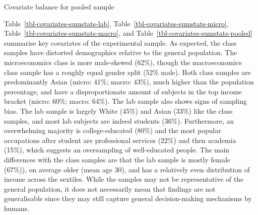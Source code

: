 \documentclass[
  12,
  letterpaper,
  DIV=11,
  numbers=noendperiod]{scrartcl}
\begin{document}
\begin{table}
{}

\caption{\label{tbl-covariates-sumstats-pooled}Covariate balance for
pooled sample}

\end{table}%

Table~\ref{tbl-covariates-sumstats-lab},
Table~\ref{tbl-covariates-sumstats-micro},
Table~\ref{tbl-covariates-sumstats-macro}, and
Table~\ref{tbl-covariates-sumstats-pooled} summarise key covariates of
the experimental sample. As expected, the class samples have distorted
demographics relative to the general population. The microeconomics
class is more male-skewed (62\%), though the macroeconomics class sample
has a roughly equal gender split (52\% male). Both class samples are
predominantly Asian (micro: 41\%; macro: 43\%), much higher than the
population percentage, and have a disproportionate amount of subjects in
the top income bracket (micro: 60\%; macro: 64\%). The lab sample also
shows signs of sampling bias. The lab sample is largely White (45\%) and
Asian (33\%) like the class samples, and most lab subjects are indeed
students (36\%). Furthermore, an overwhelming majority is
college-educated (80\%) and the most popular occupations after student
are professional services (22\%) and then academia (15\%), which
suggests an oversampling of well-educated people. The main differences
with the class samples are that the lab sample is mostly female (67\%)),
on average older (mean age 30), and has a relatively even distribution
of income across the sextiles. While the samples may not be
representative of the general population, it does not necessarily mean
that findings are not generalisable since they may still capture general
decision-making mechanisms by humans.
\end{document}
